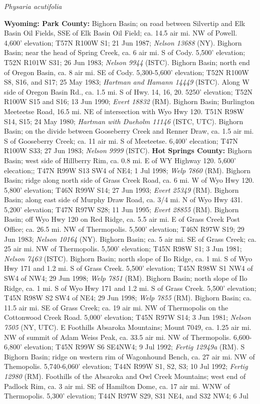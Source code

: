 \begin{center}
\textit{Physaria acutifolia}
\end{center}

\textbf{Wyoming: Park County:} Bighorn Basin; on road between Silvertip and Elk Basin Oil Fields, SSE of Elk Basin Oil Field; ca. 14.5 air mi. NW of Powell.  	4,600' elevation;	T57N R100W S1; 21 Jun 1987; \textit{Nelson	13688} (NY).  Bighorn Basin; near the head of Spring Creek, ca. 6 air mi. S of Cody. 5,500' elevation; T52N R101W S31; 26 Jun 1983; \textit{Nelson 9944} (ISTC).  Bighorn Basin; north end of Oregon Basin, ca. 8 air mi. SE of Cody. 5,300-5,600' elevation; T52N R100W S8, S16, and S17; 25 May 1983; \textit{Hartman and Hamann 14449} (ISTC).  Along W side of Oregon Basin Rd., ca. 1.5 mi. S of Hwy. 14, 16, 20.	5250' elevation; T52N R100W S15 and S16;	13 Jun 1990; \textit{Evert 18832} (RM).  Bighorn Basin; Burlington Meeteetse Road, 16.5 mi. NE of intersection with Wyo Hwy 120. T51N R98W S14, S15; 24 May 1980; \textit{Hartman with Dueholm 11146} (ISTC, UTC).  Bighorn Basin; on the divide between Gooseberry Creek and Renner Draw, ca. 1.5 air mi. S of Gooseberry Creek; ca. 11 air mi. S of Meeteetse.	6,400' elecation; T47N R100W S33; 27 Jun 1983; \textit{Nelson 9999}	(ISTC).  \textbf{Hot Springs County:} Bighorn Basin; west side of Hillberry Rim, ca. 0.8 mi. E of WY Highway 120. 5,600' elecation;; T47N R99W S13 SW4 of NE4; 1 Jul 1998; \textit{Welp 7860} (RM).  Bighorn Basin; ridge along north side of Grass Creek Road, ca. 6 mi. W of Wyo Hwy 120. 5,800' elevation; T46N R99W S14; 27 Jun 1993; \textit{Evert 25349} (RM).  Bighorn Basin; along east side of Murphy Draw Road, ca. 3/4 mi. N of Wyo Hwy 431. 5,200' elevation; T47N R97W S28; 11 Jun 1995; \textit{Evert 28855} (RM).  Bighorn Basin; off Wyo Hwy 120 on Red Ridge, ca. 5.5 air mi. E of Grass Creek Post Office; ca. 26.5 mi. NW of Thermopolis. 5,500' elevation; T46N R97W S19; 29 Jun 1983; \textit{Nelson 10164} (NY).  Bighorn Basin; ca. 5 air mi. SE of Grass Creek; ca. 25 air mi. NW of Thermopolis. 5,500' elevation; T45N R98W S1; 3 Jun 1981; \textit{Nelson 7463} (ISTC).  Bighorn Basin; north slope of Ilo Ridge, ca. 1 mi. S of Wyo Hwy 171 and 1.2 mi. S of Grass Creek.	5,500' elevation; T45N R98W S1 NW4 of SW4 of NW4; 29 Jun 1998; \textit{Welp 7851} (RM).  Bighorn Basin; north slope of Ilo Ridge, ca. 1 mi. S of Wyo Hwy 171 and 1.2 mi. S of Grass Creek.	5,500' elevation; T45N R98W S2 SW4 of NE4; 29 Jun 1998; \textit{Welp 7855} (RM).  Bighorn Basin; ca. 11.5 air mi. SE of Grass Creek; ca. 19 air mi. NW of Thermopolis on the Cottonwood Creek Road. 5,000' elevation; T45N R97W S14; 3 Jun 1981; \textit{Nelson 7505} (NY, UTC).  E Foothills Absaroka Mountains; Mount 7049, ca. 1.25 air mi. NW of summit of Adam Weiss Peak, ca. 33.5 air mi. NW of Thermopolis. 6,600-6,800' elevation; T45N R99W S6	SE4NW4; 9 Jul 1992; \textit{Fertig 12949a} (RM).  S Bighorn Basin; ridge on western rim of Wagonhound Bench, ca. 27 air mi. NW of Themopolis. 5,740-6,060' elevation; T44N R99W S1, S2, S3; 10 Jul 1992; \textit{Fertig 12980} (RM).  Foothills of the Absaroka and Owl Creek Mountains; west end of Padlock Rim, ca. 3 air mi. SE of Hamilton Dome, ca. 17 air mi. WNW of Thermopolis. 5,300' elevation; T44N R97W S29, S31 NE4, and S32 NW4; 6 Jul 